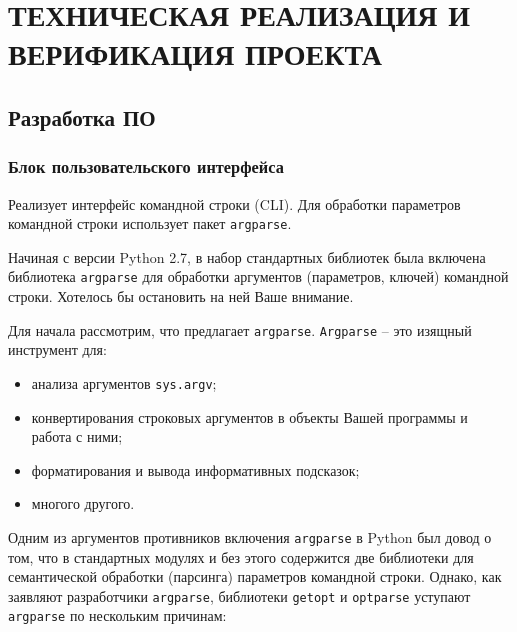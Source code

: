 \lstset{style=pythoninlinestyle}

\section{ТЕХНИЧЕСКАЯ РЕАЛИЗАЦИЯ И ВЕРИФИКАЦИЯ ПРОЕКТА}
\label{sec:func}

\subsection{Разработка ПО}
\label{sub:func:1}

\subsubsection{Блок пользовательского интерфейса }


Реализует интерфейс командной строки (CLI). Для обработки параметров командной строки использует пакет \lstinline!argparse!.

Начиная с версии Python 2.7, в набор стандартных библиотек была включена библиотека \lstinline!argparse! для обработки аргументов (параметров, ключей) командной строки. Хотелось бы остановить на ней Ваше внимание.

Для начала рассмотрим, что предлагает \lstinline!argparse!. \lstinline!Argparse! – это изящный инструмент для:
\begin{itemize}

	\item анализа аргументов \lstinline!sys.argv!;
	\item конвертирования строковых аргументов в объекты Вашей программы и работа с ними;
	\item форматирования и вывода информативных подсказок;
	\item многого другого.

\end{itemize}


Одним из аргументов противников включения \lstinline!argparse! в Python был довод о том, что в стандартных модулях и без этого содержится две библиотеки для семантической обработки (парсинга) параметров командной строки. Однако, как заявляют разработчики \lstinline!argparse!, библиотеки \lstinline!getopt! и \lstinline!optparse! уступают \lstinline!argparse! по нескольким причинам:


